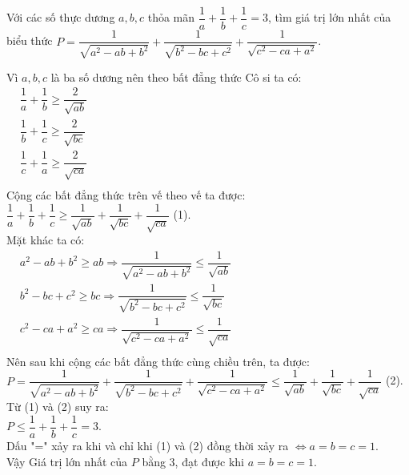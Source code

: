 \begin{ex}%
    \hfill
    Với các số thực dương $a,b,c$ thỏa mãn $\dfrac{1}{a}+\dfrac{1}{b}+\dfrac{1}{c}=3$, tìm giá trị lớn nhất của biểu thức $P=\dfrac{1}{\sqrt{a^2-ab+b^2}}+\dfrac{1}{\sqrt{b^2-bc+c^2}}+\dfrac{1}{\sqrt{c^2-ca+a^2}}$.
  
\loigiai
    {
    Vì $a,b,c$ là ba số dương nên theo bất đẳng thức Cô si ta có: \\
    $
    \begin{aligned}
    	&\dfrac{1}{a}+\dfrac{1}{b} \ge \dfrac{2}{\sqrt{ab}}\\
    	&\dfrac{1}{b}+\dfrac{1}{c} \ge \dfrac{2}{\sqrt{bc}}\\
    	&\dfrac{1}{c}+\dfrac{1}{a} \ge \dfrac{2}{\sqrt{ca}}\\
    \end{aligned}
 	$\\
 	Cộng các bất đẳng thức trên vế theo vế ta được:\\
 	$\dfrac{1}{a}+\dfrac{1}{b}+\dfrac{1}{c} \ge \dfrac{1}{\sqrt{ab}}+\dfrac{1}{\sqrt{bc}}+\dfrac{1}{\sqrt{ca}}$ (1).\\
 	Mặt khác ta có:\\
 	$
 	\begin{aligned}
 	& a^2-ab+b^2 \ge ab \Rightarrow \dfrac{1}{\sqrt{ a^2-ab+b^2}} \le \dfrac{1}{\sqrt{ab}}\\
 	& b^2-bc+c^2 \ge bc \Rightarrow \dfrac{1}{\sqrt{ b^2-bc+c^2}} \le \dfrac{1}{\sqrt{bc}}\\
 	& c^2-ca+a^2 \ge ca \Rightarrow \dfrac{1}{\sqrt{ c^2-ca+a^2}} \le \dfrac{1}{\sqrt{ca}}\\
 	\end{aligned}
 	$\\
 	Nên sau khi cộng các bất đẳng thức cùng chiều trên, ta được:\\
 	$P=\dfrac{1}{\sqrt{ a^2-ab+b^2}}+\dfrac{1}{\sqrt{ b^2-bc+c^2}}+\dfrac{1}{\sqrt{ c^2-ca+a^2}} \le \dfrac{1}{\sqrt{ab}}+\dfrac{1}{\sqrt{bc}}+\dfrac{1}{\sqrt{ca}}$ (2).\\
 	Từ (1) và (2) suy ra:\\
 	$P \le \dfrac{1}{a}+\dfrac{1}{b}+\dfrac{1}{c} =3$.\\
 	Dấu "=" xảy ra khi và chỉ khi (1) và (2) đồng thời xảy ra $\Leftrightarrow a=b=c=1$.\\
 	Vậy Giá trị lớn nhất của $P$ bằng 3, đạt được khi $a=b=c=1$.
 	
    }
\end{ex}

